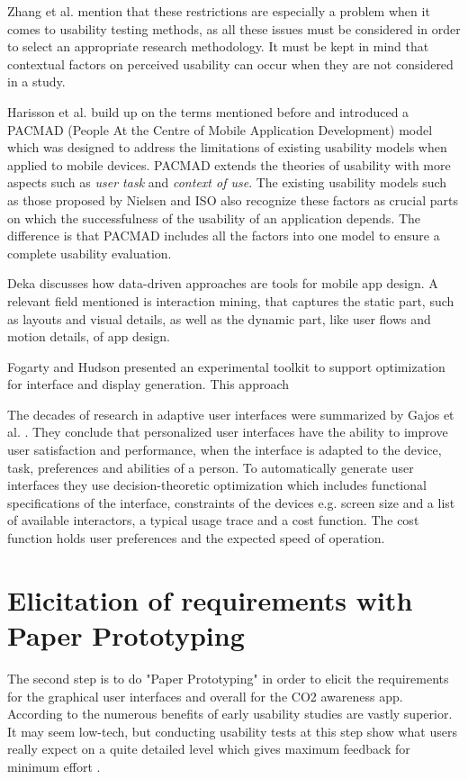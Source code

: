 Zhang et al. mention that these restrictions are especially a problem when it comes to usability testing methods, as all these issues must be considered in order to select an appropriate research methodology. It must be kept in mind that contextual factors on perceived usability can occur when they are not considered in a study.

Harisson et al. \cite{harrison2013usability} build up on the terms mentioned before and introduced a PACMAD (People At the Centre of Mobile Application Development) model which was designed to address the limitations of existing usability models when applied to mobile devices. PACMAD extends the theories of usability with more aspects such as \textit{user task} and \textit{context of use}. The existing usability models such as those proposed by Nielsen \cite{nielsen1994usability} and ISO \cite{bevan1998iso} also recognize these factors as crucial parts on which the successfulness of the usability of an application depends. The difference is that PACMAD includes all the factors into one model to ensure a complete usability evaluation.

Deka \cite{deka2016data} discusses how data-driven approaches are tools for mobile app design. A relevant field mentioned is interaction mining, that captures the static part, such as layouts and visual details, as well as the dynamic part, like user flows and motion details, of app design.

Fogarty and Hudson \cite{fogarty2003gadget} presented an experimental toolkit to support optimization for interface and display generation. This approach


The decades of research in adaptive user interfaces were summarized by Gajos et al. \cite{gajos2008decision}. They conclude that personalized user interfaces have the ability to improve user satisfaction and performance, when the interface is adapted to the device, task, preferences and abilities of a person. To automatically generate user interfaces they use decision-theoretic optimization which includes functional specifications of the interface, constraints of the devices e.g. screen size and a list of available interactors, a typical usage trace and a cost function. The cost function holds user preferences and the expected speed of operation.





\section{Elicitation of requirements with Paper Prototyping}
The second step is to do "Paper Prototyping" in order to elicit the requirements for the graphical user interfaces and overall for the CO2 awareness app. According to \cite{lancaster2004paper} the numerous benefits of early usability studies are vastly superior. It may seem low-tech, but conducting usability tests at this step show what users really expect on a quite detailed level which gives maximum feedback for minimum effort \cite{weiss2003handheld}.

